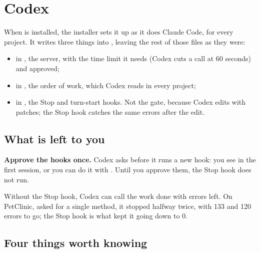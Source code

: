\documentclass[11pt,a4paper]{article}
\begin{document}
\section{Codex}
\label{sec:codex}

When  is installed, the installer sets it up as it does Claude
Code, for every project. It writes three things into , leaving
the rest of those files as they were:

\begin{itemize}
  \item in , the server, with the time limit it needs (Codex
        cuts a call at 60 seconds) and  approved;
  \item in , the order of work, which Codex reads in every
        project;
  \item in , the Stop and turn-start hooks. Not the gate,
        because Codex edits with patches; the Stop hook catches the same errors
        after the edit.
\end{itemize}

\subsection{What is left to you}

\textbf{Approve the hooks once.} Codex asks before it runs a new hook: you see
 in the first session, or you can do it with
. Until you approve them, the Stop hook does not run.

\begin{warning}
Without the Stop hook, Codex can call the work done with errors left. On
PetClinic, asked for a single method, it stopped halfway twice, with 133 and
120 errors to go; the Stop hook is what kept it going down to 0.
\end{warning}

\subsection{Four things worth knowing}
\end{document}
